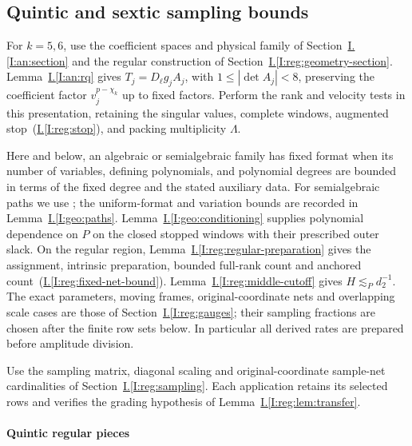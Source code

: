 \documentclass[11pt]{amsart}
\theoremstyle{definition}
\theoremstyle{remark}
\numberwithin{equation}{section}
\newcommand{\partIref}[1]{\hyperref[I:#1]{I.\ref*{I:#1}}}
\newcommand{\partIeqref}[1]{\textup{(\partIref{#1})}}
\begin{document}
\subsection{Quintic and sextic sampling bounds}\label{reg:five-six}\label{reg:finite5}\label{low:5:qcf:framework}\label{low:5:qcf:allocation}\label{low:5:qcf:spine_geometry}\label{low:5:qcf:counting}\label{low:5:qrc:section}\label{low:5:rd5:section}\label{low:5:qrr:residual}\label{reg:finite6}\label{low:6:s36cf:framework}\label{low:6:s6r:section}

For $k=5,6$, use the coefficient spaces and physical family of Section~\partIref{an:section} and the regular construction of Section~\partIref{reg:geometry-section}. Lemma~\partIref{an:rq} gives $T_j=D_\ell g_jA_j$, with $1\le|\det A_j|<8$, preserving the coefficient factor $v_j^{p-\chi_k}$ up to fixed factors. Perform the rank and velocity tests in this presentation, retaining the singular values, complete windows, augmented stop~\partIeqref{reg:stop}, and packing multiplicity $\Lambda$.

Here and below, an algebraic or semialgebraic family has fixed format when its number of variables, defining polynomials, and polynomial degrees are bounded in terms of the fixed degree and the stated auxiliary data. For semialgebraic paths we use \cite[Theorems 5.22 and 5.23]{BPR}; the uniform-format and variation bounds are recorded in Lemma~\partIref{geo:paths}. Lemma~\partIref{geo:conditioning} supplies polynomial dependence on $P$ on the closed stopped windows with their prescribed outer slack. On the regular region, Lemma~\partIref{reg:regular-preparation} gives the assignment, intrinsic preparation, bounded full-rank count and anchored count~\partIeqref{reg:fixed-net-bound}. Lemma~\partIref{reg:middle-cutoff} gives $H\lesssim_Pd_2^{-1}$. The exact parameters, moving frames, original-coordinate nets and overlapping scale cases are those of Section~\partIref{reg:gauges}; their sampling fractions are chosen after the finite row sets below. In particular all derived rates are prepared before amplitude division.

Use the sampling matrix, diagonal scaling and original-coordinate sample-net cardinalities of Section~\partIref{reg:sampling}. Each application retains its selected rows and verifies the grading hypothesis of Lemma~\partIref{reg:lem:transfer}.

\paragraph{Quintic regular pieces}
\end{document}
